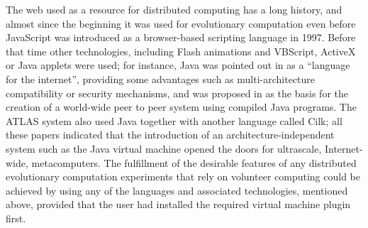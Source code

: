 \documentclass{sig-alternate}
\begin{document}
The web used as a resource for distributed computing has a
long history, and almost since the beginning it was used for
evolutionary computation even before JavaScript was
introduced as a browser-based scripting language in 1997. Before that
time other technologies,
 including Flash animations and VBScript, ActiveX or Java applets were
used; for instance, Java was pointed out in \cite{soares1998get} as a
``language for the internet'', providing some advantages such as multi-architecture compatibility or
security mechanisms, and was proposed in \cite{chandy1996world} as the
basis for the creation of a world-wide peer to peer system using compiled Java
programs. The ATLAS system
\cite{Baldeschwieler:1996:TIG:504450.504482} also used Java together
with another language called Cilk; all these papers indicated that
the introduction of an architecture-independent system such as the
Java virtual machine opened the doors for ultrascale, Internet-wide,
metacomputers. 
The fulfillment of the desirable features of any distributed evolutionary 
computation experiments that rely on volunteer computing \cite{2016arXiv160101607Manom} could be achieved by using any of the
languages and associated technologies, mentioned above, provided that the user had
installed the required virtual machine plugin first. 
\end{document}
